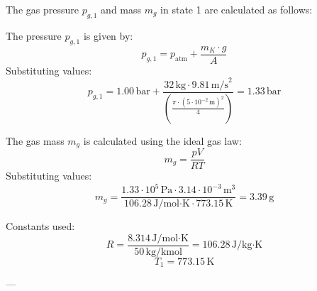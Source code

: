 The gas pressure \( p_{g,1} \) and mass \( m_g \) in state 1 are calculated as follows:  

The pressure \( p_{g,1} \) is given by:  
\[
p_{g,1} = p_{\text{atm}} + \frac{m_K \cdot g}{A}
\]  
Substituting values:  
\[
p_{g,1} = 1.00 \, \text{bar} + \frac{32 \, \text{kg} \cdot 9.81 \, \text{m/s}^2}{\left( \frac{\pi \cdot (5 \cdot 10^{-2} \, \text{m})^2}{4} \right)} = 1.33 \, \text{bar}
\]  

The gas mass \( m_g \) is calculated using the ideal gas law:  
\[
m_g = \frac{p V}{R T}
\]  
Substituting values:  
\[
m_g = \frac{1.33 \cdot 10^5 \, \text{Pa} \cdot 3.14 \cdot 10^{-3} \, \text{m}^3}{106.28 \, \text{J/mol·K} \cdot 773.15 \, \text{K}} = 3.39 \, \text{g}
\]  

Constants used:  
\[
R = \frac{8.314 \, \text{J/mol·K}}{50 \, \text{kg/kmol}} = 106.28 \, \text{J/kg·K}
\]  
\[
T_1 = 773.15 \, \text{K}
\]  

---